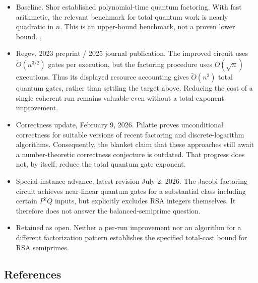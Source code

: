 \begin{itemize}
  \item Baseline. Shor established polynomial-time quantum factoring. With fast arithmetic, the relevant benchmark for total quantum work is nearly quadratic in $n$. This is an upper-bound benchmark, not a proven lower bound. , 

  \item Regev, 2023 preprint / 2025 journal publication. The improved circuit uses $\widetilde O(n^{3/2})$ gates per execution, but the factoring procedure uses $O(\sqrt n)$ executions. Thus its displayed resource accounting gives $\widetilde O(n^2)$ total quantum gates, rather than settling the target above. Reducing the cost of a single coherent run remains valuable even without a total-exponent improvement. 

  \item Correctness update, February 9, 2026. Pilatte proves unconditional correctness for suitable versions of recent factoring and discrete-logarithm algorithms. Consequently, the blanket claim that these approaches still await a number-theoretic correctness conjecture is outdated. That progress does not, by itself, reduce the total quantum gate exponent. 

  \item Special-instance advance, latest revision July 2, 2026. The Jacobi factoring circuit achieves near-linear quantum gates for a substantial class including certain $P^2Q$ inputs, but explicitly excludes RSA integers themselves. It therefore does not answer the balanced-semiprime question. 

  \item Retained as open. Neither a per-run improvement nor an algorithm for a different factorization pattern establishes the specified total-cost bound for RSA semiprimes.
\end{itemize}

\subsection*{References}

